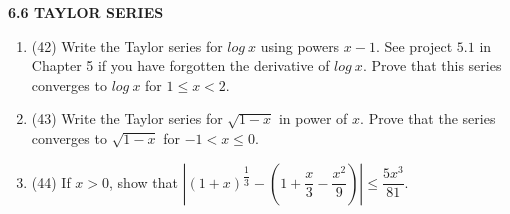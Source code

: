 \documentclass[fleqn]{article}
\begin{document}
  \textbf{6.6 TAYLOR SERIES}
  \begin{enumerate}
    \item (42) Write the Taylor series for $log ~ x$ using powers $x-1$. See project $5.1$ in Chapter 5 if
    you have forgotten the derivative of $log ~ x$. Prove that this series converges to $log ~ x$ for $1 \leq x <2$.

          

    \item (43) Write the Taylor series for $\sqrt{1-x}$ in power of $x$. Prove that the series converges to $\sqrt{1-x}$ for
    $-1 < x \leq 0$.

          

    \item (44) If $x > 0$, show that $|\left(1+x\right)^{\dfrac{1}{3}}-\left(1+\dfrac{x}{3}-\dfrac{x^2}{9}\right)| \leq \dfrac{5x^3}{81}$.

          

  \end{enumerate}
\end{document}
